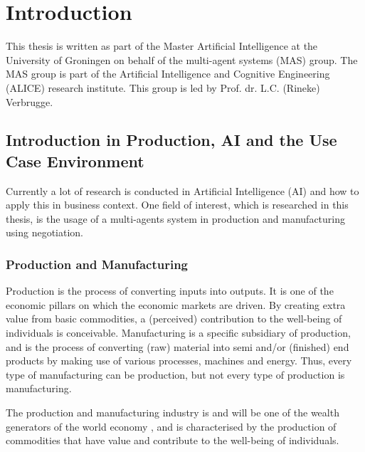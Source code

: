 \chapter{Introduction}
\label{ch:intro}
This thesis is written as part of the Master Artificial Intelligence at the University of Groningen on behalf of the multi-agent systems (MAS) group. The MAS group is part of the Artificial Intelligence and Cognitive Engineering (ALICE) research institute. This group is led by Prof. dr. L.C. (Rineke) Verbrugge.
   
\section{Introduction in Production, AI and the Use Case Environment}

Currently a lot of research is conducted in Artificial Intelligence (AI) and how to apply this in business context. One field of interest, which is researched in this thesis, is the usage of a multi-agents system in production and manufacturing using negotiation.

\subsection{Production and Manufacturing}
Production is the process of converting inputs into outputs. It is one of the economic pillars on which the economic markets are driven. By creating extra value from basic commodities, a (perceived) contribution to the well-being of individuals is conceivable. Manufacturing is a specific subsidiary of production, and is the process of converting (raw) material into semi and/or (finished) end products by making use of various processes, machines and energy. Thus, every type of manufacturing can be production, but not every type of production is manufacturing.

The production and manufacturing industry is and will be one of the wealth generators of the world economy \citep{monostori2006agent}, and is characterised by the production of commodities that have value and contribute to the well-being of individuals.

